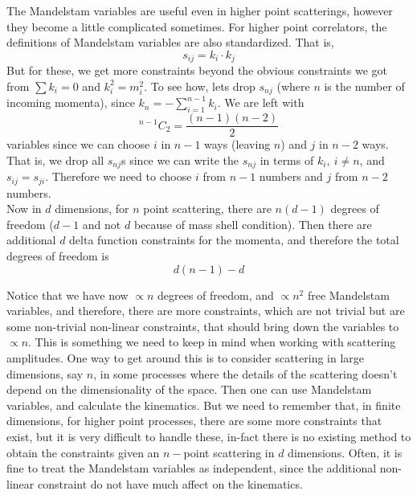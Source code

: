 \documentclass[11pt]{article}
\numberwithin{equation}{section}
\begin{document}
    The Mandelstam variables are useful even in higher point scatterings, however they become a little complicated sometimes. For higher point correlators, the definitions of Mandelstam variables are also standardized. That is, 
    \begin{equation*}
        s_{ij} = k_i\cdot k_j
    \end{equation*}
    But for these, we get more constraints beyond the obvious constraints we got from \(\sum k_i = 0\) and \(k_i^2 = m_i^2\). To see how, lets drop \(s_{nj}\) (where \(n\) is the number of incoming momenta), since \(k_n = -\sum_{i=1}^{n-1}k_i\). We are left with 
    \begin{equation*}
        {}^{n-1}C_2 = \frac{(n-1)(n-2)}{2}
    \end{equation*}
    variables since we can choose \(i\) in \(n-1\) ways (leaving \(n\)) and \(j\) in \(n-2\) ways. That is, we drop all \(s_{nj}\)s since we can write the \(s_{nj}\) in terms of \(k_i,~i\ne n\), and \(s_{ij} = s_{ji}\). Therefore we need to choose \(i\) from \(n-1\) numbers and \(j\) from \(n-2\) numbers. \\

    Now in \(d\) dimensions, for \(n\) point scattering, there are \(n(d-1)\) degrees of freedom (\(d-1\) and not \(d\) because of mass shell condition). Then there are additional \(d\) delta function constraints for the momenta, and therefore the total degrees of freedom is 
    \begin{equation*}
        d(n-1) - d
    \end{equation*}

    Notice that we have now \(\propto n\) degrees of freedom, and \(\propto n^2\) free Mandelstam variables, and therefore, there are more constraints, which are not trivial but are some non-trivial non-linear constraints, that should bring down the variables to \(\propto n\). This is something we need to keep in mind when working with scattering amplitudes. One way to get around this is to consider scattering in large dimensions, say \(n\), in some processes where the details of the scattering doesn't depend on the dimensionality of the space. Then one can use Mandelstam variables, and calculate the kinematics. But we need to remember that, in finite dimensions, for higher point processes, there are some more constraints that exist, but it is very difficult to handle these, in-fact there is no existing method to obtain the constraints given an \(n-\)point scattering in \(d\) dimensions. Often, it is fine to treat the Mandelstam variables as independent, since the additional non-linear constraint do not have much affect on the kinematics.
\end{document}
